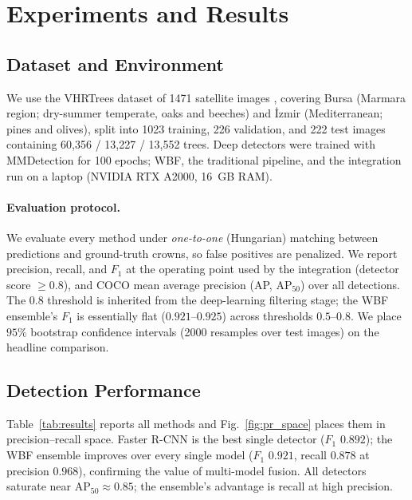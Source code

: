 \documentclass{article}
\begin{document}
\section{Experiments and Results}\label{sec:results}

\subsection{Dataset and Environment}
We use the VHRTrees dataset of 1471 satellite images \cite{10.3389/ffgc.2024.1495544}, covering Bursa (Marmara region; dry-summer temperate, oaks and beeches) and İzmir (Mediterranean; pines and olives), split into 1023 training, 226 validation, and 222 test images containing 60{,}356 / 13{,}227 / 13{,}552 trees. Deep detectors were trained with MMDetection \cite{chen2019mmdetection} for 100 epochs; WBF, the traditional pipeline, and the integration run on a laptop (NVIDIA RTX A2000, 16~GB RAM).

\paragraph{Evaluation protocol.} We evaluate every method under \emph{one-to-one} (Hungarian) matching between predictions and ground-truth crowns, so false positives are penalized. We report precision, recall, and $F_1$ at the operating point used by the integration (detector score $\geq 0.8$), and COCO mean average precision (AP, AP$_{50}$) over all detections. The $0.8$ threshold is inherited from the deep-learning filtering stage; the WBF ensemble's $F_1$ is essentially flat ($0.921$--$0.925$) across thresholds $0.5$--$0.8$. We place $95\%$ bootstrap confidence intervals (2000 resamples over test images) on the headline comparison.

\subsection{Detection Performance}

Table~\ref{tab:results} reports all methods and Fig.~\ref{fig:pr_space} places them in precision--recall space. Faster R-CNN is the best single detector ($F_1$ $0.892$); the WBF ensemble improves over every single model ($F_1$ $0.921$, recall $0.878$ at precision $0.968$), confirming the value of multi-model fusion. All detectors saturate near AP$_{50}\approx 0.85$; the ensemble's advantage is recall at high precision.
\end{document}
